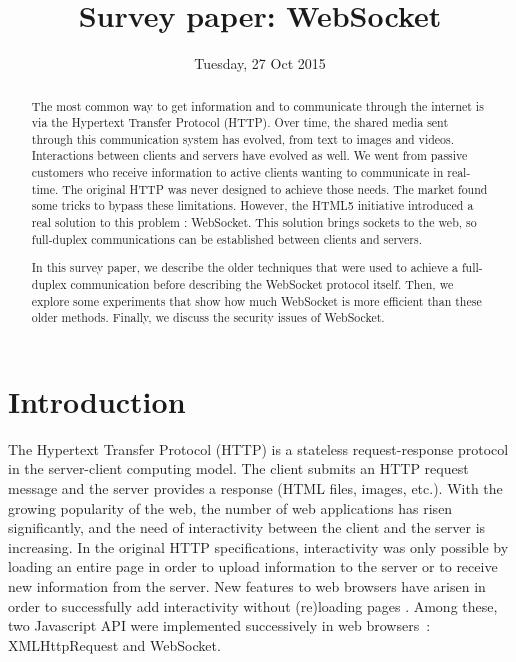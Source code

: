 \documentclass[10pt,journal,compsoc]{IEEEtran}
\newcommand{\ws}{WebSocket}
\begin{document}
\author{}

\title{Survey paper: \ws}

\date{Tuesday, 27 Oct 2015}

\maketitle
\IEEEpeerreviewmaketitle



\begin{abstract}
The most common way to get information and to communicate through the internet is via the Hypertext Transfer Protocol (HTTP).
Over time, the shared media sent through this communication system has evolved, from text to images and videos.
Interactions between clients and servers have evolved as well.
We went from passive customers who receive information to active clients wanting to communicate in real-time.
The original HTTP was never designed to achieve those needs.
The market found some tricks to bypass these limitations.
However, the HTML5 initiative introduced a real solution to this problem : \ws{}.
This solution brings sockets to the web, so full-duplex communications can be established between clients and servers.

In this survey paper, we describe the older techniques that were used to achieve a full-duplex communication before describing the \ws{} protocol itself.
Then, we explore some experiments that show how much \ws{} is more efficient than these older methods.
Finally, we discuss the security issues of \ws{}.
\end{abstract}


\section{Introduction}

The Hypertext Transfer Protocol (HTTP) is a stateless request-response protocol in the server-client computing model.
The client submits an HTTP request message and the server provides a response (HTML files, images, etc.).
With the growing popularity of the web, the number of web applications has risen significantly, and the need of interactivity between the client and the server is increasing.
In the original HTTP specifications, interactivity was only possible by loading an entire page in order to upload information to the server or to receive new information from the server.
New features to web browsers have arisen in order to successfully add interactivity without (re)loading pages \cite{RealTimeMonitoringUsingAJAXAndWebSockets}.
Among these, two Javascript API were implemented successively in web \mbox{browsers :} XMLHttpRequest and \ws.
\end{document}

